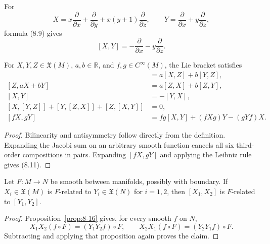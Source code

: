 \begin{example}
\label{ex:8-27}




For
\[
X=x\frac{\partial}{\partial x}+\frac{\partial}{\partial y}
  +x(y+1)\frac{\partial}{\partial z},
\qquad
Y=\frac{\partial}{\partial x}+y\frac{\partial}{\partial z},
\]
formula (8.9) gives
\[
[X,Y]=-\frac{\partial}{\partial x}-y\frac{\partial}{\partial z}.
\]
\end{example}

\begin{proposition}
\label{prop:8-28}




For $X,Y,Z\in\mathfrak{X}(M)$, $a,b\in\mathbb{R}$, and
$f,g\in C^\infty(M)$, the Lie bracket satisfies
\begin{align*}
[aX+bY,Z]&=a[X,Z]+b[Y,Z],\\
[Z,aX+bY]&=a[Z,X]+b[Z,Y],\\
[X,Y]&=-[Y,X],\\
[X,[Y,Z]]+[Y,[Z,X]]+[Z,[X,Y]]&=0,\\
[fX,gY]&=fg[X,Y]+(fXg)Y-(gYf)X. \tag{8.11}
\end{align*}
\end{proposition}

\begin{proof}

\sketch Bilinearity and antisymmetry follow directly from the definition.
Expanding the Jacobi sum on an arbitrary smooth function cancels all six
third-order compositions in pairs. Expanding $[fX,gY]$ and applying the
Leibniz rule gives (8.11).
\end{proof}


\begin{proposition}
\label{prop:8-30}





Let $F\colon M\to N$ be smooth between manifolds, possibly with boundary. If
$X_i\in\mathfrak{X}(M)$ is $F$-related to $Y_i\in\mathfrak{X}(N)$ for
$i=1,2$, then $[X_1,X_2]$ is $F$-related to $[Y_1,Y_2]$.
\end{proposition}

\begin{proof}

\sketch Proposition~\ref{prop:8-16} gives, for every smooth $f$ on $N$,
\[
X_1X_2(f\circ F)=(Y_1Y_2f)\circ F,
\qquad
X_2X_1(f\circ F)=(Y_2Y_1f)\circ F.
\]
Subtracting and applying that proposition again proves the claim.
\end{proof}

